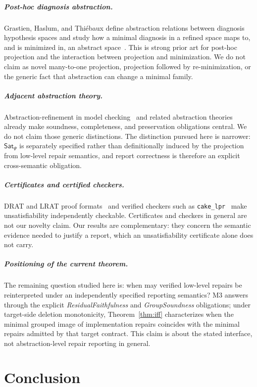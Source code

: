 \documentclass[sigplan,10pt,review,anonymous]{acmart}
\theoremstyle{acmdefinition}
\newcommand{\code}[1]{\texttt{#1}}
\newcommand{\SatPsi}{{\mathsf{Sat}_\Psi}}
\begin{document}
\subparagraph*{Post-hoc diagnosis abstraction.} Grastien, Haslum, and
Thi\'ebaux define abstraction relations between diagnosis hypothesis spaces
and study how a minimal diagnosis in a refined space maps to, and is minimized
in, an abstract space~\cite{GrastienEtAl2023}. This is strong prior art for
post-hoc projection and the interaction between projection and minimization.
We do not claim as novel many-to-one projection, projection followed by
re-minimization, or the generic fact that abstraction can change a minimal
family.

\subparagraph*{Adjacent abstraction theory.} Abstraction-refinement in model
checking~\cite{Clarke2003CEGAR} and related abstraction theories already make
soundness, completeness, and preservation obligations central. We do not
claim those generic distinctions. The distinction pursued here is narrower:
$\SatPsi$ is separately specified rather than definitionally induced by the
projection from low-level repair semantics, and report correctness is therefore
an explicit cross-semantic obligation.

\subparagraph*{Certificates and certified checkers.} DRAT and LRAT proof
formats~\cite{WetzlerHeuleHunt2014,CruzFilipe2017} and verified checkers
such as \code{cake\_lpr}~\cite{TanHeuleMyreen2021} make unsatisfiability
independently checkable. Certificates and checkers in general are not our
novelty claim. Our results are complementary: they concern the semantic
evidence needed to justify a report, which an unsatisfiability certificate
alone does not carry.

\subparagraph*{Positioning of the current theorem.} The remaining question
studied here is: when may verified low-level repairs be reinterpreted under an
independently specified reporting semantics? M3 answers through the explicit
\emph{ResidualFaithfulness} and \emph{GroupSoundness} obligations; under
target-side deletion monotonicity, Theorem~\ref{thm:iff} characterizes when
the minimal grouped image of implementation repairs coincides with the minimal
repairs admitted by that target contract. This claim is about the stated
interface, not abstraction-level repair reporting in general.

\section{Conclusion}
\label{sec:conclusion}
\end{document}
